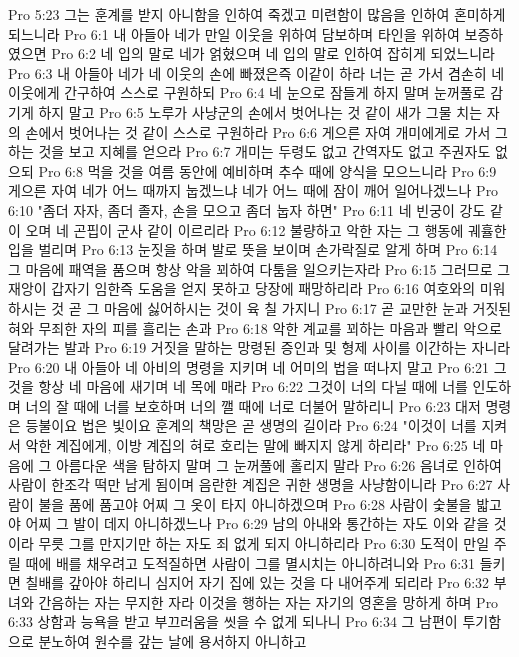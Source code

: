 Pro 5:23  그는 훈계를 받지 아니함을 인하여 죽겠고 미련함이 많음을 인하여 혼미하게 되느니라
Pro 6:1  내 아들아 네가 만일 이웃을 위하여 담보하며 타인을 위하여 보증하였으면
Pro 6:2  네 입의 말로 네가 얽혔으며 네 입의 말로 인하여 잡히게 되었느니라
Pro 6:3  내 아들아 네가 네 이웃의 손에 빠졌은즉 이같이 하라 너는 곧 가서 겸손히 네 이웃에게 간구하여 스스로 구원하되
Pro 6:4  네 눈으로 잠들게 하지 말며 눈꺼풀로 감기게 하지 말고
Pro 6:5  노루가 사냥군의 손에서 벗어나는 것 같이 새가 그물 치는 자의 손에서 벗어나는 것 같이 스스로 구원하라
Pro 6:6  게으른 자여 개미에게로 가서 그 하는 것을 보고 지혜를 얻으라
Pro 6:7  개미는 두령도 없고 간역자도 없고 주권자도 없으되
Pro 6:8  먹을 것을 여름 동안에 예비하며 추수 때에 양식을 모으느니라
Pro 6:9  게으른 자여 네가 어느 때까지 눕겠느냐 네가 어느 때에 잠이 깨어 일어나겠느나
Pro 6:10  "좀더 자자, 좀더 졸자, 손을 모으고 좀더 눕자 하면"
Pro 6:11  네 빈궁이 강도 같이 오며 네 곤핍이 군사 같이 이르리라
Pro 6:12  불량하고 악한 자는 그 행동에 궤휼한 입을 벌리며
Pro 6:13  눈짓을 하며 발로 뜻을 보이며 손가락질로 알게 하며
Pro 6:14  그 마음에 패역을 품으며 항상 악을 꾀하여 다툼을 일으키는자라
Pro 6:15  그러므로 그 재앙이 갑자기 임한즉 도움을 얻지 못하고 당장에 패망하리라
Pro 6:16  여호와의 미워하시는 것 곧 그 마음에 싫어하시는 것이 육 칠 가지니
Pro 6:17  곧 교만한 눈과 거짓된 혀와 무죄한 자의 피를 흘리는 손과
Pro 6:18  악한 계교를 꾀하는 마음과 빨리 악으로 달려가는 발과
Pro 6:19  거짓을 말하는 망령된 증인과 및 형제 사이를 이간하는 자니라
Pro 6:20  내 아들아 네 아비의 명령을 지키며 네 어미의 법을 떠나지 말고
Pro 6:21  그것을 항상 네 마음에 새기며 네 목에 매라
Pro 6:22  그것이 너의 다닐 때에 너를 인도하며 너의 잘 때에 너를 보호하며 너의 깰 때에 너로 더불어 말하리니
Pro 6:23  대저 명령은 등불이요 법은 빛이요 훈계의 책망은 곧 생명의 길이라
Pro 6:24  "이것이 너를 지켜서 악한 계집에게, 이방 계집의 혀로 호리는 말에 빠지지 않게 하리라"
Pro 6:25  네 마음에 그 아름다운 색을 탐하지 말며 그 눈꺼풀에 홀리지 말라
Pro 6:26  음녀로 인하여 사람이 한조각 떡만 남게 됨이며 음란한 계집은 귀한 생명을 사냥함이니라
Pro 6:27  사람이 불을 품에 품고야 어찌 그 옷이 타지 아니하겠으며
Pro 6:28  사람이 숯불을 밟고야 어찌 그 발이 데지 아니하겠느나
Pro 6:29  남의 아내와 통간하는 자도 이와 같을 것이라 무릇 그를 만지기만 하는 자도 죄 없게 되지 아니하리라
Pro 6:30  도적이 만일 주릴 때에 배를 채우려고 도적질하면 사람이 그를 멸시치는 아니하려니와
Pro 6:31  들키면 칠배를 갚아야 하리니 심지어 자기 집에 있는 것을 다 내어주게 되리라
Pro 6:32  부녀와 간음하는 자는 무지한 자라 이것을 행하는 자는 자기의 영혼을 망하게 하며
Pro 6:33  상함과 능욕을 받고 부끄러움을 씻을 수 없게 되나니
Pro 6:34  그 남편이 투기함으로 분노하여 원수를 갚는 날에 용서하지 아니하고
